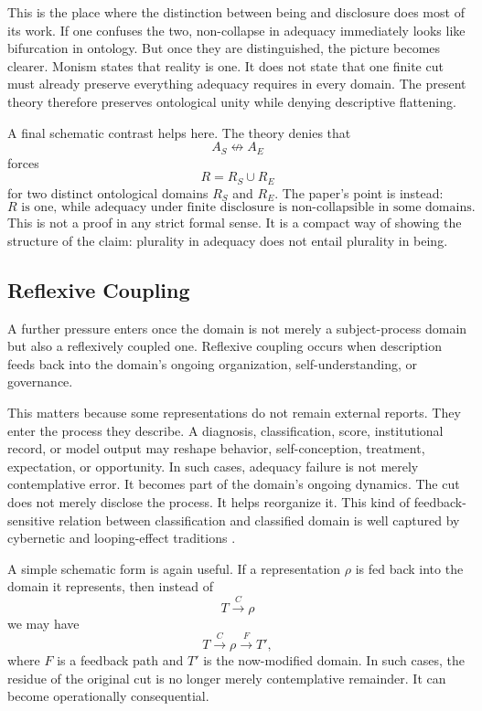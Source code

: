 \documentclass[11pt]{article}
\begin{document}
This is the place where the distinction between being and disclosure does most of its work. If one confuses the two, non-collapse in adequacy immediately looks like bifurcation in ontology. But once they are distinguished, the picture becomes clearer. Monism states that reality is one. It does not state that one finite cut must already preserve everything adequacy requires in every domain. The present theory therefore preserves ontological unity while denying descriptive flattening.

A final schematic contrast helps here. The theory denies that
\[
A_S \not\leftrightarrow A_E
\]
forces
\[
R = R_S \cup R_E
\]
for two distinct ontological domains \(R_S\) and \(R_E\). The paper's point is instead:
\[
R \text{ is one, while adequacy under finite disclosure is non-collapsible in some domains.}
\]
This is not a proof in any strict formal sense. It is a compact way of showing the structure of the claim: plurality in adequacy does not entail plurality in being.

\subsection{Reflexive Coupling}

A further pressure enters once the domain is not merely a subject-process domain but also a reflexively coupled one. Reflexive coupling occurs when description feeds back into the domain's ongoing organization, self-understanding, or governance.

This matters because some representations do not remain external reports. They enter the process they describe. A diagnosis, classification, score, institutional record, or model output may reshape behavior, self-conception, treatment, expectation, or opportunity. In such cases, adequacy failure is not merely contemplative error. It becomes part of the domain's ongoing dynamics. The cut does not merely disclose the process. It helps reorganize it. This kind of feedback-sensitive relation between classification and classified domain is well captured by cybernetic and looping-effect traditions \cite{Bateson1972,Pask1975,Hacking1995}.

A simple schematic form is again useful. If a representation \(\rho\) is fed back into the domain it represents, then instead of
\[
T \xrightarrow{C} \rho
\]
we may have
\[
T \xrightarrow{C} \rho \xrightarrow{F} T',
\]
where \(F\) is a feedback path and \(T'\) is the now-modified domain. In such cases, the residue of the original cut is no longer merely contemplative remainder. It can become operationally consequential.
\end{document}

